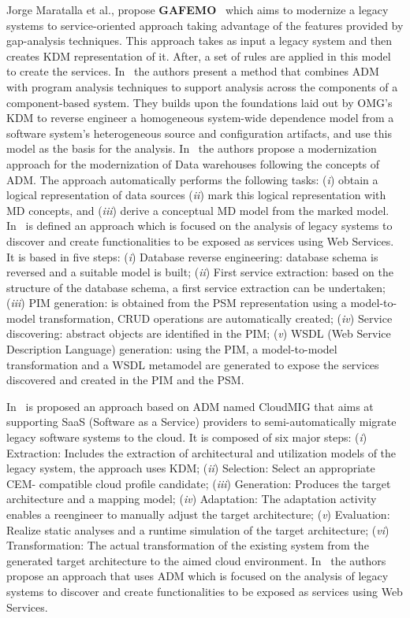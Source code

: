  Jorge Maratalla et al., propose \textbf{GAFEMO}~\cite{6311013} which aims to modernize a legacy systems to service-oriented approach taking advantage of the features provided by gap-analysis techniques. This approach takes as input a legacy system and then creates KDM representation of it. After, a set of rules are applied in this model to create the services. In~\cite{6080786} the authors present a method that combines ADM with program analysis techniques to support analysis across the components of a component-based system. They builds upon the foundations laid out by OMG's KDM to reverse engineer a homogeneous system-wide dependence model from a software system's heterogeneous source and configuration artifacts, and use this model as the basis for the analysis. In~\cite{Mazon:2007:MDM:1784489.1784497} the authors propose a modernization approach for the modernization of Data warehouses following the concepts of ADM. The approach automatically performs the following tasks: (\textit{i}) obtain a logical representation of data sources (\textit{ii}) mark this logical representation with MD concepts, and (\textit{iii}) derive a conceptual MD model from the marked model. In~\cite{Guzman:2007:AAR:1339262.1339532} is defined an approach which is focused on the analysis of legacy systems to discover and create functionalities to be exposed as services using Web Services. It is based in five steps: (\textit{i}) Database reverse engineering: database schema is reversed and a suitable model is built; (\textit{ii}) First service extraction: based on the structure of the database schema, a first service extraction can be undertaken; (\textit{iii}) PIM generation: is obtained from the PSM representation using a model-to-model transformation, CRUD operations are automatically created; (\textit{iv}) Service discovering: abstract objects are identified in the PIM; (\textit{v}) WSDL (Web Service Description Language) generation: using the PIM, a model-to-model transformation and a WSDL  metamodel are generated to expose the services discovered and created in the PIM and the PSM. 

In~\cite{5741334, SMR:SMR582} is proposed an approach based on ADM named CloudMIG that aims at supporting SaaS (Software as a Service) providers to semi-automatically migrate legacy software systems to the cloud. It is composed of six major steps: (\textit{i}) Extraction: Includes the extraction of architectural and utilization models of the legacy system, the approach uses KDM; (\textit{ii}) Selection: Select an appropriate CEM- compatible cloud profile candidate; (\textit{iii}) Generation: Produces the target architecture and a mapping model; (\textit{iv}) Adaptation: The adaptation activity enables a reengineer to manually adjust the target architecture; (\textit{v}) Evaluation: Realize static analyses and a runtime simulation of the target architecture; (\textit{vi}) Transformation: The actual transformation of the existing system from the generated target architecture to the aimed cloud environment. In~\cite{4400179} the authors propose an approach that uses ADM which is focused on the analysis of legacy systems to discover and create functionalities to be exposed as services using Web Services.

